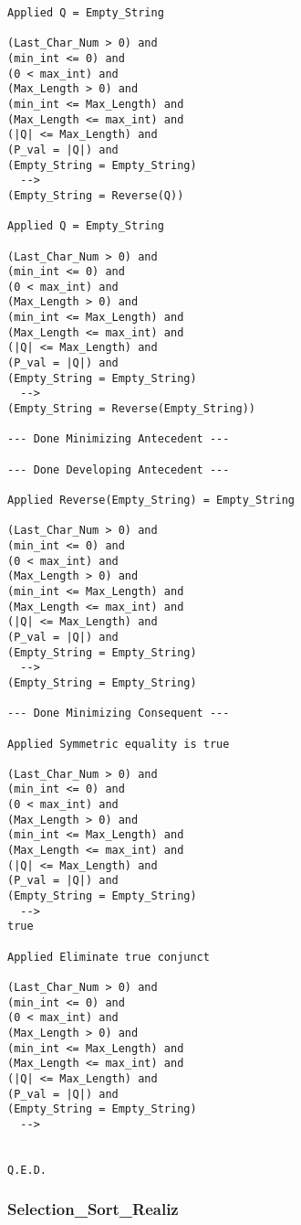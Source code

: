 \begin{lstlisting}[language=resolve]
Applied Q = Empty_String

(Last_Char_Num > 0) and
(min_int <= 0) and
(0 < max_int) and
(Max_Length > 0) and
(min_int <= Max_Length) and
(Max_Length <= max_int) and
(|Q| <= Max_Length) and
(P_val = |Q|) and
(Empty_String = Empty_String)
  -->
(Empty_String = Reverse(Q))

Applied Q = Empty_String

(Last_Char_Num > 0) and
(min_int <= 0) and
(0 < max_int) and
(Max_Length > 0) and
(min_int <= Max_Length) and
(Max_Length <= max_int) and
(|Q| <= Max_Length) and
(P_val = |Q|) and
(Empty_String = Empty_String)
  -->
(Empty_String = Reverse(Empty_String))

--- Done Minimizing Antecedent ---

--- Done Developing Antecedent ---

Applied Reverse(Empty_String) = Empty_String

(Last_Char_Num > 0) and
(min_int <= 0) and
(0 < max_int) and
(Max_Length > 0) and
(min_int <= Max_Length) and
(Max_Length <= max_int) and
(|Q| <= Max_Length) and
(P_val = |Q|) and
(Empty_String = Empty_String)
  -->
(Empty_String = Empty_String)

--- Done Minimizing Consequent ---

Applied Symmetric equality is true

(Last_Char_Num > 0) and
(min_int <= 0) and
(0 < max_int) and
(Max_Length > 0) and
(min_int <= Max_Length) and
(Max_Length <= max_int) and
(|Q| <= Max_Length) and
(P_val = |Q|) and
(Empty_String = Empty_String)
  -->
true

Applied Eliminate true conjunct

(Last_Char_Num > 0) and
(min_int <= 0) and
(0 < max_int) and
(Max_Length > 0) and
(min_int <= Max_Length) and
(Max_Length <= max_int) and
(|Q| <= Max_Length) and
(P_val = |Q|) and
(Empty_String = Empty_String)
  -->


Q.E.D.

\end{lstlisting}

		\subsubsection{Selection\_Sort\_Realiz}	%

